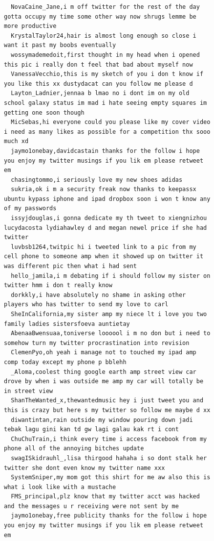 \begin{figure}[htpb]
\begin{verbatim}
  NovaCaine_Jane,i m off twitter for the rest of the day gotta occupy my time some other way now shrugs lemme be more productive
  KrystalTaylor24,hair is almost long enough so close i want it past my boobs eventually
  wossymademedoit,first thought in my head when i opened this pic i really don t feel that bad about myself now
  VanessaVecchio,this is my sketch of you i don t know if you like this xx dustydacat can you follow me please d
  Layton_Ladnier,jennaa b lmao no i dont im on my old school galaxy status im mad i hate seeing empty squares im getting one soon though
  MicSebas,hi everyone could you please like my cover video i need as many likes as possible for a competition thx sooo much xd
  jaymo1onebay,davidcastain thanks for the follow i hope you enjoy my twitter musings if you lik em please retweet em
  chasingtommo,i seriously love my new shoes adidas
  sukria,ok i m a security freak now thanks to keepassx ubuntu kypass iphone and ipad dropbox soon i won t know any of my passwords
  issyjdouglas,i gonna dedicate my th tweet to xiengnizhou lucydacosta lydiahawley d and megan newel price if she had twitter
  luvbsb1264,twitpic hi i tweeted link to a pic from my cell phone to someone amp when it showed up on twitter it was different pic then what i had sent
  hello_jamila,i m debating if i should follow my sister on twitter hmm i don t really know
  dorkkly,i have absolutely no shame in asking other players who has twitter to send my love to carl
  SheInCalifornia,my sister amp my niece lt i love you two family ladies sistersfoeva auntietay
  AbenaaBwensuaa,toniverse loooool i m no don but i need to somehow turn my twitter procrastination into revision
  ClemenPyo,oh yeah i manage not to touched my ipad amp comp today except my phone p bblehh
  _Aloma,coolest thing google earth amp street view car drove by when i was outside me amp my car will totally be in street view
  ShanTheWanted_x,thewantedmusic hey i just tweet you and this is crazy but here s my twitter so follow me maybe d xx
  diwantintan,rain outside my window pouring down jadi tebak lagu gini kan td gw lagi galau kak rt i cont
  ChuChuTrain,i think every time i access facebook from my phone all of the annoying bitches update
  swagISkidrauhl_,lisa thirgood hahaha i so dont stalk her twitter she dont even know my twitter name xxx
  SystemSniper,my mom got this shirt for me aw also this is what i look like with a mustache
  FMS_principal,plz know that my twitter acct was hacked and the messages u r receiving were not sent by me
  jaymo1onebay,free publicity thanks for the follow i hope you enjoy my twitter musings if you lik em please retweet em

\end{verbatim}
\end{figure}
